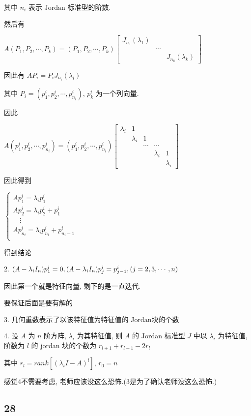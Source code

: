 \documentclass[a4paper, draft]{article}
\begin{document}
其中 $n_i$ 表示 $\text{Jordan}$ 标准型的阶数.

然后有

$A(P_1,P_2,\cdots,P_k)=(P_1,P_2,\cdots,P_k)\begin{bmatrix}
J_{n_1}(\lambda_1)&&\\
&\cdots&\\
&&J_{n_k}(\lambda_k)
\end{bmatrix}$

因此有 $AP_i=P_iJ_{n_i}(\lambda_i)$

其中 $P_i=(p_1^i,p_2^i,\cdots,p_{n_i}^i)$, $p_{k}^{i}$ 为一个列向量.

因此 

$A(p_1^i,p_2^i,\cdots,p_{n_i}^i)=(p_1^i,p_2^i,\cdots,p_{n_i}^i)\begin{bmatrix}
\lambda_i&1&&&\\
&\lambda_i&1&&\\
&&\cdots&\cdots&\\
&&&\lambda_i&1\\
&&&&\lambda_i
\end{bmatrix}$

因此得到

$\begin{cases}
Ap_1^i=\lambda_ip_1^i\\
Ap_2^i=\lambda_ip_2^i+p_1^i\\
\quad\vdots\\
Ap_{n_i}^i=\lambda_ip_{n_i}^i+p_{n_{i}-1}^i\\
\end{cases}$

得到结论

2. $
(A-\lambda_iI_n)p_{1}^i=0,\\
(A-\lambda_iI_n)p_{j}^i=p_{j-1}^i,(j=2,3,\cdots,n)
$

因此第一个就是特征向量, 剩下的是一直迭代.

要保证后面是要有解的

3. 几何重数表示了以该特征值为特征值的 Jordan块的个数

4. 设 $A$ 为 $n$ 阶方阵, $\lambda_i$ 为其特征值, 则 $A$ 的 Jordan 标准型 $J$ 中以 $\lambda_i$ 为特征值, 阶数为 $l$ 的 jordan 块的个数为 $r_{l+1}+r_{l-1}-2r_{l}$

其中 $r_{l}=rank[(\lambda_iI-A)^l]$, $r_0=n$

感觉4不需要考虑, 老师应该没这么恐怖.(3是为了确认老师没这么恐怖.)

\subsection*{28}
\end{document}

